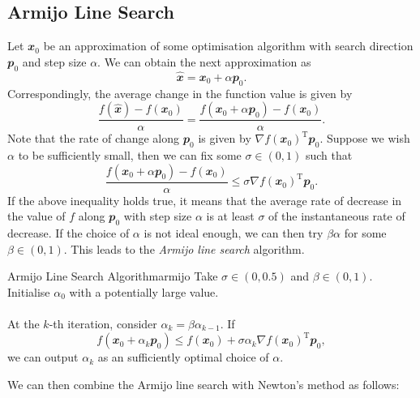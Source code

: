 \documentclass[math, code]{amznotes}
\theoremstyle{remark}
\begin{document}
\subsection{Armijo Line Search}
Let $\mathbfit{x}_0$ be an approximation of some optimisation algorithm with search direction $\mathbfit{p}_0$ and step size $\alpha$. We can obtain the next approximation as
\begin{equation*}
    \hat{\mathbfit{x}} = \mathbfit{x}_0 + \alpha\mathbfit{p}_0.
\end{equation*} 
Correspondingly, the average change in the function value is given by
\begin{equation*}
    \frac{f(\hat{\mathbfit{x}}) - f(\mathbfit{x}_0)}{\alpha} = \frac{f(\mathbfit{x}_0 + \alpha\mathbfit{p}_0) - f(\mathbfit{x}_0)}{\alpha}.
\end{equation*}
Note that the rate of change along $\mathbfit{p}_0$ is given by $\nabla f(\mathbfit{x}_0)^{\mathrm{T}}\mathbfit{p}_0$. Suppose we wish $\alpha$ to be sufficiently small, then we can fix some $\sigma \in (0, 1)$ such that
\begin{equation*}
    \frac{f(\mathbfit{x}_0 + \alpha\mathbfit{p}_0) - f(\mathbfit{x}_0)}{\alpha} \leq \sigma\nabla f(\mathbfit{x}_0)^{\mathrm{T}}\mathbfit{p}_0.
\end{equation*}
If the above inequality holds true, it means that the average rate of decrease in the value of $f$ along $\mathbfit{p}_0$ with step size $\alpha$ is at least $\sigma$ of the instantaneous rate of decrease. If the choice of $\alpha$ is not ideal enough, we can then try $\beta\alpha$ for some $\beta \in (0, 1)$. This leads to the \textit{Armijo line search} algorithm. 
\begin{tecbox}{Armijo Line Search Algorithm}{armijo}
    Take $\sigma \in (0, 0.5)$ and $\beta \in (0, 1)$. Initialise $\alpha_0$ with a potentially large value.
    \\\\
    At the $k$-th iteration, consider $\alpha_k = \beta\alpha_{k - 1}$. If
    \begin{equation*}
        f(\mathbfit{x}_0 + \alpha_k\mathbfit{p}_0) \leq f(\mathbfit{x}_0) + \sigma\alpha_k\nabla f(\mathbfit{x}_0)^{\mathrm{T}}\mathbfit{p}_0,
    \end{equation*}
    we can output $\alpha_k$ as an sufficiently optimal choice of $\alpha$.
\end{tecbox}
We can then combine the Armijo line search with Newton's method as follows:
\end{document}
